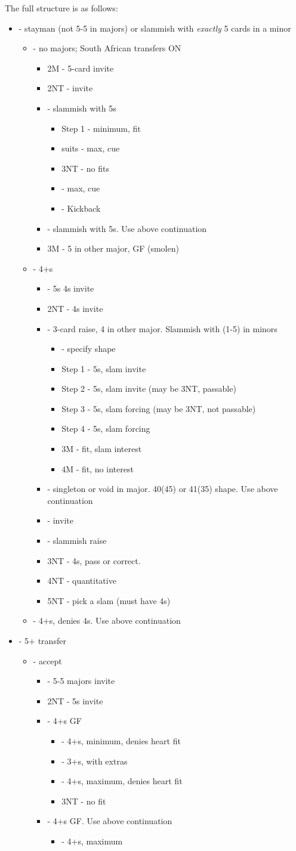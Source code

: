 \documentclass[12pt]{report}
\newcommand{\q}[1]{\multido{}{#1}{\qquad}}
\newcommand{\ul}[1]{\begin{itemize}#1\end{itemize}}
\newcommand{\li}[1]{\item[~] \q{#1}}
\begin{document}
    The full structure is as follows:
    \ul{
        \li0  - stayman (not 5-5 in majors) or slammish with \textit{exactly} 5 cards in a minor
        \ul{
            \li0 \di2 - no majors; South African transfers ON
            \ul{
                \li0 2M - 5-card invite
                \li0 2NT - invite
                \li0 \cl3 - slammish with 5\cl{}s
                \ul{
                    \li0 Step 1 - minimum, fit
                    \li0 suits - max, cue
                    \li0 3NT - no fits
                    \li0 \cl4 - max, cue
                    \li0 \di4 - Kickback
                }

                \li0 \di3 - slammish with 5\di{}s. Use above continuation

                \li0 3M - 5 in other major, GF (smolen)
            }
            \li0 \he2 - 4+\he{}s
            \ul {
                \li0 \sp2 - 5\sp{}s 4\he{}s invite
                \li0 2NT - 4\sp{}s invite
                \li0 \cl3 - 3-card raise, 4 in other major.  Slammish with (1-5) in minors
                \ul {
                    \li0 \di3 - specify shape
                        \li0 Step 1 - 5\cl{}s, slam invite
                        \li0 Step 2 - 5\di{}s, slam invite (may be 3NT, passable)
                        \li0 Step 3 - 5\cl{}s, slam forcing (may be 3NT, not passable)
                        \li0 Step 4 - 5\di{}s, slam forcing

                    \li0 3M - fit, slam interest
                    \li0 4M - fit, no interest
                }
                \li0 \di3 - singleton or void in major.  40(45) or 41(35) shape.  Use above continuation
                \li0 \he3 - invite
                \li0 \sp3 - slammish \he{} raise
                \li0 3NT - 4\sp{}s, pass or correct.
                \li0 4NT - quantitative
                \li0 5NT - pick a slam (must have 4\sp{}s)
            }

            \li0 \sp2 - 4+\sp{}s, denies 4\he{}s.  Use above continuation
        }
        \li0 \di2 - 5+\he{} transfer
        \ul {
            \li0 \he2 - accept
            \ul {
                \li0 \sp2 - 5-5 majors invite
                \li0 2NT - 5\he{}s invite
                \li0 \cl3 - 4+\cl{}s GF
                \ul {
                    \li0 \di3 - 4+\cl{}s, minimum, denies heart fit
                    \li0 \he3 - 3+\he{}s, with extras
                    \li0 \sp3 - 4+\cl{}s, maximum, denies heart fit
                    \li0 3NT - no fit
                }
                \li0 \di3 - 4+\di{}s GF.  Use above continuation
                \ul {
                    \li0 \cl4 - 4+\di{}s, maximum
                }
                
}}}
\end{document}

